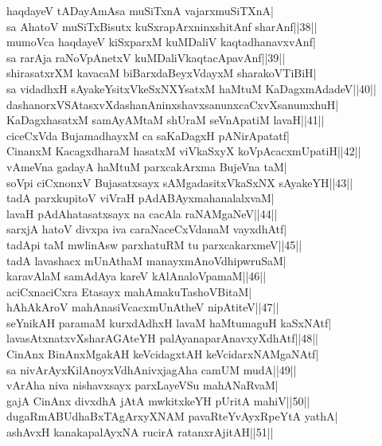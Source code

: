 \documentclass{article}
\begin{document}
haqdayeV tADayAmAsa muSiTxnA vajarxmuSiTXnA|\\
sa AhatoV muSiTxBisutx kuSxrapArxninxshitAnf sharAnf||38||\\
mumoVca haqdayeV kiSxparxM kuMDaliV kaqtadhanavxvAnf|\\
sa rarAja raNoVpAnetxV kuMDaliVkaqtacApavAnf||39||\\
shirasatxrXM kavacaM biBarxdaBeyxVdayxM sharakoVTiBiH|\\
sa vidadhxH sAyakeYsitxVkeSxNXYsatxM haMtuM KaDagxmAdadeV||40||\\
dashanorxVSAtasxvXdashanAninxshavxsanunxcaCxvXsanumxhuH|\\
KaDagxhasatxM samAyAMtaM shUraM seVnApatiM lavaH||41||\\
ciceCxVda BujamadhayxM ca saKaDagxH pANirApatatf|\\
CinanxM KacagxdharaM hasatxM viVkaSxyX koVpAcacxmUpatiH||42||\\
vAmeVna gadayA haMtuM parxcakArxma BujeVna taM|\\
soVpi ciCxnonxV Bujasatxsayx sAMgadasitxVkaSxNX sAyakeYH||43||\\
tadA parxkupitoV viVraH pAdABAyxmahanalalxvaM|\\
lavaH pAdAhatasatxsayx na cacAla raNAMgaNeV||44||\\
sarxjA hatoV divxpa iva caraNaceCxVdanaM vayxdhAtf|\\
tadApi taM mwlinAsw parxhatuRM tu parxcakarxmeV||45||\\
tadA lavashacx mUnAthaM manayxmAnoVdhipwruSaM|\\
karavAlaM samAdAya kareV kAlAnaloVpamaM||46||\\
aciCxnaciCxra Etasayx mahAmakuTashoVBitaM|\\
hAhAkAroV mahAnasiVcacxmUnAtheV nipAtiteV||47||\\
seYnikAH paramaM kurxdAdhxH lavaM haMtumaguH kaSxNAtf|\\
lavasAtxnatxvXsharAGAteYH palAyanaparAnavxyXdhAtf||48||\\
CinAnx BinAnxMgakAH keVcidagxtAH keVcidarxNAMgaNAtf|\\
sa nivArAyxKilAnoyxVdhAnivxjagAha camUM mudA||49||\\
vArAha niva nishavxsayx parxLayeVSu mahANaRvaM|\\
gajA CinAnx divxdhA jAtA mwkitxkeYH pUritA mahiV||50||\\
dugaRmABUdhaBxTAgArxyXNAM pavaRteYvAyxRpeYtA yathA|\\
ashAvxH kanakapalAyxNA rucirA ratanxrAjitAH||51||\\
\end{document}
